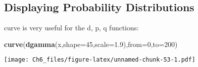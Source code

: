 \documentclass[
]{article}
\newenvironment{Shaded}{\begin{snugshade}}{\end{snugshade}}
\newcommand{\AttributeTok}[1]{\textcolor[rgb]{0.13,0.29,0.53}{#1}}
\newcommand{\DecValTok}[1]{\textcolor[rgb]{0.00,0.00,0.81}{#1}}
\newcommand{\FloatTok}[1]{\textcolor[rgb]{0.00,0.00,0.81}{#1}}
\newcommand{\FunctionTok}[1]{\textcolor[rgb]{0.13,0.29,0.53}{\textbf{#1}}}
\newcommand{\NormalTok}[1]{#1}
\begin{document}
\subsection{Displaying Probability
Distributions}\label{displaying-probability-distributions}

curve is very useful for the d, p, q functions:

\begin{Shaded}
\begin{Highlighting}[]
\FunctionTok{curve}\NormalTok{(}\FunctionTok{dgamma}\NormalTok{(x,}\AttributeTok{shape=}\DecValTok{45}\NormalTok{,}\AttributeTok{scale=}\FloatTok{1.9}\NormalTok{),}\AttributeTok{from=}\DecValTok{0}\NormalTok{,}\AttributeTok{to=}\DecValTok{200}\NormalTok{)}
\end{Highlighting}
\end{Shaded}

\texttt{[image: Ch6\_files/figure-latex/unnamed-chunk-53-1.pdf]}
\end{document}
